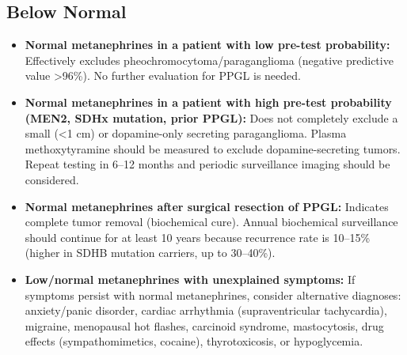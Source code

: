 \subsection*{Below Normal}
\begin{itemize}
  \item \textbf{Normal metanephrines in a patient with low pre-test probability:} Effectively excludes pheochromocytoma/paraganglioma (negative predictive value >96\%). No further evaluation for PPGL is needed.
  \item \textbf{Normal metanephrines in a patient with high pre-test probability (MEN2, SDHx mutation, prior PPGL):} Does not completely exclude a small (<1 cm) or dopamine-only secreting paraganglioma. Plasma methoxytyramine should be measured to exclude dopamine-secreting tumors. Repeat testing in 6--12 months and periodic surveillance imaging should be considered.
  \item \textbf{Normal metanephrines after surgical resection of PPGL:} Indicates complete tumor removal (biochemical cure). Annual biochemical surveillance should continue for at least 10 years because recurrence rate is 10--15\% (higher in SDHB mutation carriers, up to 30--40\%).
  \item \textbf{Low/normal metanephrines with unexplained symptoms:} If symptoms persist with normal metanephrines, consider alternative diagnoses: anxiety/panic disorder, cardiac arrhythmia (supraventricular tachycardia), migraine, menopausal hot flashes, carcinoid syndrome, mastocytosis, drug effects (sympathomimetics, cocaine), thyrotoxicosis, or hypoglycemia.
\end{itemize}


